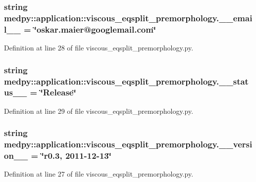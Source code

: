 \hypertarget{namespacemedpy_1_1application_1_1viscous__eqsplit__premorphology_a5d7738414d3728b1e02f1205303f585c}{
\subsubsection[{\_\-\_\-email\_\-\_\-}]{\setlength{\rightskip}{0pt plus 5cm}string {\bf medpy::application::viscous\_\-eqsplit\_\-premorphology.\_\-\_\-email\_\-\_\-} = \char`\"{}oskar.maier@googlemail.com\char`\"{}}}
\label{namespacemedpy_1_1application_1_1viscous__eqsplit__premorphology_a5d7738414d3728b1e02f1205303f585c}


Definition at line 28 of file viscous\_\-eqsplit\_\-premorphology.py.

\hypertarget{namespacemedpy_1_1application_1_1viscous__eqsplit__premorphology_a3bbc0b51f05866a25687c0bb95e745e8}{
\subsubsection[{\_\-\_\-status\_\-\_\-}]{\setlength{\rightskip}{0pt plus 5cm}string {\bf medpy::application::viscous\_\-eqsplit\_\-premorphology.\_\-\_\-status\_\-\_\-} = \char`\"{}Release\char`\"{}}}
\label{namespacemedpy_1_1application_1_1viscous__eqsplit__premorphology_a3bbc0b51f05866a25687c0bb95e745e8}


Definition at line 29 of file viscous\_\-eqsplit\_\-premorphology.py.

\hypertarget{namespacemedpy_1_1application_1_1viscous__eqsplit__premorphology_a401a3d6abb1b8c694dcc10dc58398556}{
\subsubsection[{\_\-\_\-version\_\-\_\-}]{\setlength{\rightskip}{0pt plus 5cm}string {\bf medpy::application::viscous\_\-eqsplit\_\-premorphology.\_\-\_\-version\_\-\_\-} = \char`\"{}r0.3, 2011-\/12-\/13\char`\"{}}}
\label{namespacemedpy_1_1application_1_1viscous__eqsplit__premorphology_a401a3d6abb1b8c694dcc10dc58398556}


Definition at line 27 of file viscous\_\-eqsplit\_\-premorphology.py.

